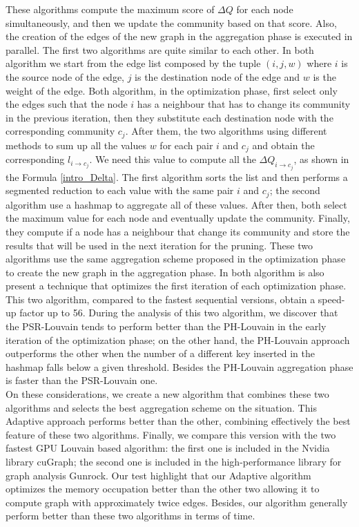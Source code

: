 These algorithms compute the maximum score of $\Delta Q$ for each node simultaneously, and then we update the community based on that score. Also, the creation of the edges of the new graph in the aggregation phase is executed in parallel. 
The first two algorithms are quite similar to each other. In both algorithm we start from the edge list composed by the tuple $(i,j,w)$ where $i$ is the source node of the edge, $j$ is the destination node of the edge and $w$ is the weight of the edge.
Both algorithm, in the optimization phase, first select only the edges such that the node $i$ has a neighbour that has to change its community in the previous iteration, then they substitute each destination node with the corresponding community $c_j$. After them, the two algorithms using different methods to sum up all the values $w$ for each pair $i$ and $c_j$ and obtain the corresponding $l_{i\rightarrow c_j}$. We need this value to compute all the $\Delta Q_{i \rightarrow c_j}$, as shown in the Formula \ref{intro_Delta}. The first algorithm sorts the list and then performs a segmented reduction to each value with the same pair $i$ and $c_j$; the second algorithm use a hashmap to aggregate all of these values. After then, both select the maximum value for each node and eventually update the community. Finally, they compute if a node has a neighbour that change its community and store the results that will be used in the next iteration for the pruning. These two algorithms use the same aggregation scheme proposed in the optimization phase to create the new graph in the aggregation phase. In both algorithm is also present a technique that optimizes the first iteration of each optimization phase. \\
This two algorithm, compared to the fastest sequential versions, obtain a speed-up factor up to 56.
During the analysis of this two algorithm, we discover that the PSR-Louvain tends to perform better than the PH-Louvain in the early iteration of the optimization phase; on the other hand, the PH-Louvain approach outperforms the other when the number of a different key inserted in the hashmap falls below a given threshold. Besides the PH-Louvain aggregation phase is faster than the PSR-Louvain one. \\
On these considerations, we create a new algorithm that combines these two algorithms and selects the best aggregation scheme on the situation. This Adaptive approach performs better than the other, combining effectively the best feature of these two algorithms. Finally, we compare this version with the two fastest GPU Louvain based algorithm: the first one is included in the Nvidia library cuGraph; the second one is included in the high-performance library for graph analysis Gunrock. Our test highlight that our Adaptive algorithm optimizes the memory occupation better than the other two allowing it to compute graph with approximately twice edges. Besides, our algorithm generally perform better than these two algorithms in terms of time.\\
